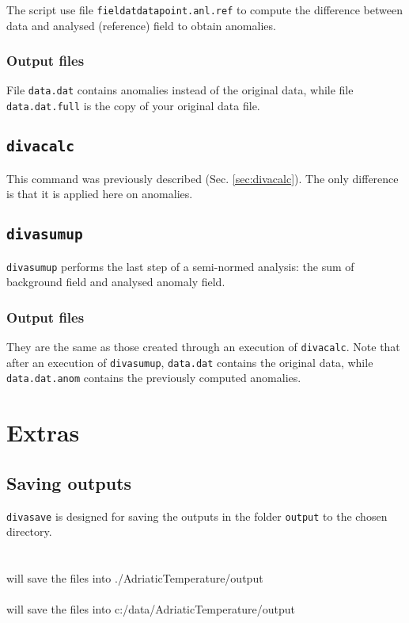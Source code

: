 The script use file \texttt{fieldatdatapoint.anl.ref} to compute the difference between data and analysed (reference) field to obtain anomalies.

\subsubsection{Output files}

File \texttt{data.dat} contains anomalies instead of the original data, while file \texttt{data.dat.full} is the copy of your original data file.


\subsection{\texttt{divacalc}}

This command was previously described (Sec. \ref{sec:divacalc}). The only difference is that it is applied here on anomalies.


\subsection{\texttt{divasumup}}

\texttt{divasumup} performs the last step of a semi-normed analysis: the sum of background field and analysed anomaly field. 

\subsubsection{Output files}

They are the same as those created through an execution of \texttt{divacalc}. Note that after an execution of \texttt{divasumup}, \texttt{data.dat} contains the original data, while \texttt{data.dat.anom} contains the previously computed anomalies. 



\section{Extras}

\subsection{Saving outputs}

\texttt{divasave} is designed for saving the outputs in the folder \texttt{output} to the chosen directory.\\
\examples\\
\\
\hspace{1cm} will save the files into ./AdriaticTemperature/output\\
\\
\hspace{1cm} will save the files into c:/data/AdriaticTemperature/output

